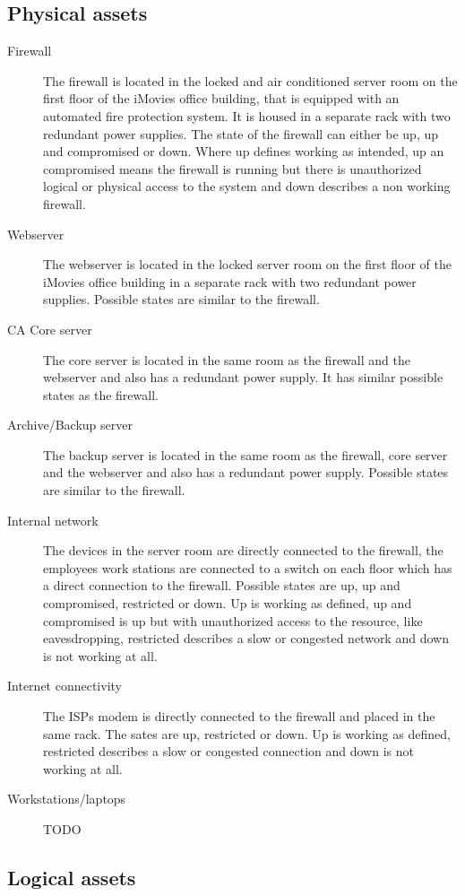 \documentclass[a4paper, toc=index, 12pt, DIV14, twoside, BCOR2cm, headsepline, numbers=noenddot, bibliography=totoc]{scrbook}
\begin{document}
\subsection{Physical assets}
\begin{description}
\item[Firewall ] The firewall is located in the locked and air conditioned server room on the first floor of the iMovies office building, that is equipped with an automated fire protection system. It is housed in a separate rack with two redundant power supplies. The state of the firewall can either be up, up and compromised or down. Where up defines working as intended, up an compromised means the firewall is running but there is unauthorized logical or physical access to the system and down describes a non working firewall.
\item[Webserver ] The webserver is located in the locked server room on the first floor of the iMovies office building in a separate rack with two redundant power supplies. Possible states are similar to the firewall.
\item[CA Core server ] The core server is located in the same room as the firewall and the webserver and also has a redundant power supply. It has similar possible states as the firewall.
\item[Archive/Backup server ] The backup server is located in the same room as the firewall, core server and the webserver and also has a redundant power supply. Possible states are similar to the firewall.
\item[Internal network ] The devices in the server room are directly connected to the firewall, the employees work stations are connected to a switch on each floor which has a direct connection to the firewall. Possible states are up, up and compromised, restricted or down. Up is working as defined, up and compromised is up but with unauthorized access to the resource, like eavesdropping, restricted describes a slow or congested network and down is not working at all.
\item[Internet connectivity ] The ISPs modem is directly connected to the firewall and placed in the same rack. The sates are up, restricted or down. Up is working as defined, restricted describes a slow or congested connection and down is not working at all.
\item[Workstations/laptops ] TODO
\end{description}

\subsection{Logical assets}
\end{document}
